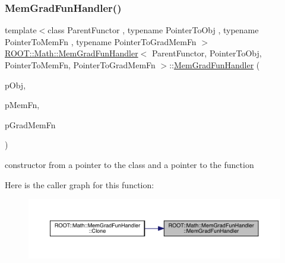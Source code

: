 \subsubsection{\texorpdfstring{MemGradFunHandler()}{MemGradFunHandler()}\hspace{0.1cm}{\footnotesize\ttfamily [1/4]}}
{\footnotesize\ttfamily template$<$class Parent\+Functor , typename Pointer\+To\+Obj , typename Pointer\+To\+Mem\+Fn , typename Pointer\+To\+Grad\+Mem\+Fn $>$ \\
\mbox{\hyperlink{classROOT_1_1Math_1_1MemGradFunHandler}{R\+O\+O\+T\+::\+Math\+::\+Mem\+Grad\+Fun\+Handler}}$<$ Parent\+Functor, Pointer\+To\+Obj, Pointer\+To\+Mem\+Fn, Pointer\+To\+Grad\+Mem\+Fn $>$\+::\mbox{\hyperlink{classROOT_1_1Math_1_1MemGradFunHandler}{Mem\+Grad\+Fun\+Handler}} (\begin{DoxyParamCaption}\item[{const Pointer\+To\+Obj \&}]{p\+Obj,  }\item[{Pointer\+To\+Mem\+Fn}]{p\+Mem\+Fn,  }\item[{Pointer\+To\+Grad\+Mem\+Fn}]{p\+Grad\+Mem\+Fn }\end{DoxyParamCaption})\hspace{0.3cm}{\ttfamily [inline]}}



constructor from a pointer to the class and a pointer to the function 

Here is the caller graph for this function\+:\nopagebreak
\begin{figure}[H]
\begin{center}
\leavevmode
\includegraphics[width=350pt]{dc/dbd/classROOT_1_1Math_1_1MemGradFunHandler_afb840379796fb7d05d885bc3152a3175_icgraph}
\end{center}
\end{figure}
\mbox{\label{classROOT_1_1Math_1_1MemGradFunHandler_a1e421d0a42589a826fd0b9f7f1a475ec}} 
